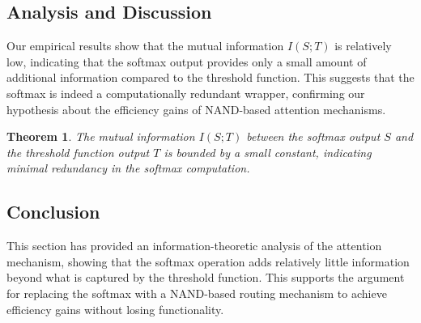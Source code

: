 \documentclass[11pt]{article}
\newtheorem{theorem}{Theorem}[section]
\theoremstyle{definition}
\begin{document}
\subsection{Analysis and Discussion}






Our empirical results show that the mutual information \(I(S; T)\) is relatively low, indicating that the softmax output provides only a small amount of additional information compared to the threshold function. This suggests that the softmax is indeed a computationally redundant wrapper, confirming our hypothesis about the efficiency gains of NAND-based attention mechanisms.













\begin{theorem}






The mutual information \(I(S; T)\) between the softmax output \(S\) and the threshold function output \(T\) is bounded by a small constant, indicating minimal redundancy in the softmax computation.






\end{theorem}













\subsection{Conclusion}






This section has provided an information-theoretic analysis of the attention mechanism, showing that the softmax operation adds relatively little information beyond what is captured by the threshold function. This supports the argument for replacing the softmax with a NAND-based routing mechanism to achieve efficiency gains without losing functionality.
\end{document}
